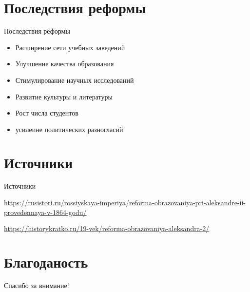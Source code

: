 \section{Последствия реформы}
\begin{frame}{Последствия реформы}
	\begin{itemize}
		\item Расширение сети учебных заведений
		\item Улучшение качества образования
		\item Стимулирование научных исследований
		\item Развитие культуры и литературы
		\item Рост числа студентов
		\item усилеине политических разногласий
	\end{itemize}
\end{frame}

\section{Источники}

\begin{frame}[t]{Источники}
	\Large{
	\url{https://rusistori.ru/rossiyskaya-imperiya/reforma-obrazovaniya-pri-aleksandre-ii-provedennaya-v-1864-godu/}

	\url{https://historykratko.ru/19-vek/reforma-obrazovaniya-aleksandra-2/}}
\end{frame}


\section{Благоданость}
\begin{frame}
	\centering
	\huge
	Спасибо за внимание!
\end{frame}


